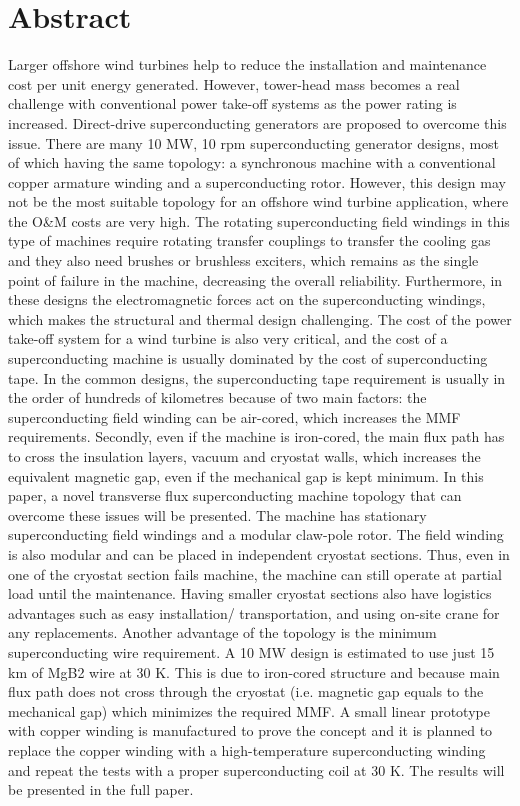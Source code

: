 \documentclass[12pt]{IET02}
\begin{document}
\section*{Abstract}
Larger offshore wind turbines help to reduce the installation and maintenance cost per unit energy generated. However, tower-head mass becomes a real challenge with conventional power take-off systems as the power rating is increased. Direct-drive superconducting generators are proposed to overcome this issue. There are many 10 MW, 10 rpm superconducting generator designs, most of which having the same topology: a synchronous machine with a conventional copper armature winding and a superconducting rotor. However, this design may not be the most suitable topology for an offshore wind turbine application, where the O&M costs are very high. 
The rotating superconducting field windings in this type of machines require rotating transfer couplings to transfer the cooling gas and they also need brushes or brushless exciters, which remains as the single point of failure in the machine, decreasing the overall reliability. Furthermore, in these designs the electromagnetic forces act on the superconducting windings, which makes the structural and thermal design challenging.
The cost of the power take-off system for a wind turbine is also very critical, and the cost of a superconducting machine is usually dominated by the cost of superconducting tape. In the common designs, the superconducting tape requirement is usually in the order of hundreds of kilometres because of two main factors: the superconducting field winding can be air-cored, which increases the MMF requirements. Secondly, even if the machine is iron-cored, the main flux path has to cross the insulation layers, vacuum and cryostat walls, which increases the equivalent magnetic gap, even if the mechanical gap is kept minimum.
In this paper, a novel transverse flux superconducting machine topology that can overcome these issues will be presented. The machine has stationary superconducting field windings and a modular claw-pole rotor. The field winding is also modular and can be placed in independent cryostat sections. Thus, even in one of the cryostat section fails machine, the machine can still operate at partial load until the maintenance. Having smaller cryostat sections also have logistics advantages such as easy installation/ transportation, and using on-site crane for any replacements. Another advantage of the topology is the minimum superconducting wire requirement. A 10 MW design is estimated to use just 15 km of MgB2 wire at 30 K. This is due to iron-cored structure and because main flux path does not cross through the cryostat (i.e. magnetic gap equals to the mechanical gap) which minimizes the required MMF.
A small linear prototype with copper winding is manufactured to prove the concept and it is planned to replace the copper winding with a high-temperature superconducting winding and repeat the tests with a proper superconducting coil at 30 K. The results will be presented in the full paper.
\vspace{1pc}
\end{document}

